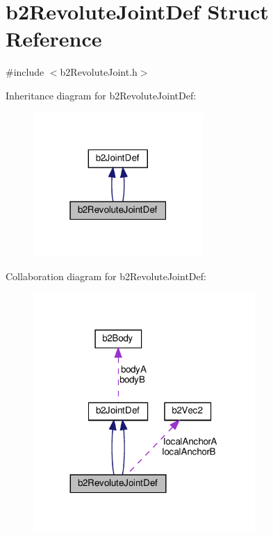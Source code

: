 \hypertarget{structb2RevoluteJointDef}{}\section{b2\+Revolute\+Joint\+Def Struct Reference}
\label{structb2RevoluteJointDef}


{\ttfamily \#include $<$b2\+Revolute\+Joint.\+h$>$}



Inheritance diagram for b2\+Revolute\+Joint\+Def\+:
\nopagebreak
\begin{figure}[H]
\begin{center}
\leavevmode
\includegraphics[width=183pt]{structb2RevoluteJointDef__inherit__graph}
\end{center}
\end{figure}


Collaboration diagram for b2\+Revolute\+Joint\+Def\+:
\nopagebreak
\begin{figure}[H]
\begin{center}
\leavevmode
\includegraphics[width=239pt]{structb2RevoluteJointDef__coll__graph}
\end{center}
\end{figure}
